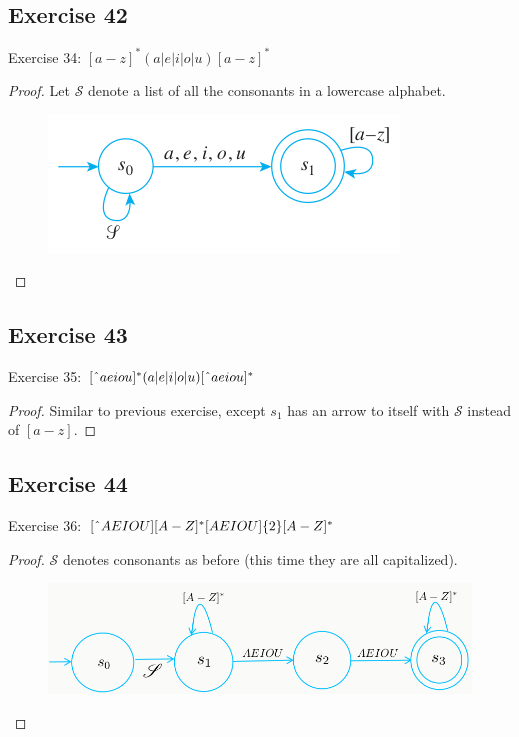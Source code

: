 \documentclass[14pt]{extarticle}
\begin{document}
\subsection{Exercise 42}
Exercise 34: \([a - z]^*(a | e | i | o | u)[a - z]^*\)
\begin{proof}
Let \(\mathscr{S}\) denote a list of all the consonants in a lowercase alphabet.

\begin{figure}[ht!]
\centering
\includegraphics[scale=0.5]{../images/12.2.42.png}
\end{figure}
\end{proof}

\subsection{Exercise 43}
Exercise 35: \([\string^ aeiou]^*(a|e|i|o|u)[\string^ aeiou]^*\)
\begin{proof}
Similar to previous exercise, except \(s_1\) has an arrow to itself with \(\mathscr{S}\) instead of \([a-z]\).
\end{proof}

\subsection{Exercise 44}
Exercise 36: \([\string^ AEIOU][A-Z]^*[AEIOU]\{2\}[A-Z]^*\)
\begin{proof}
\(\mathscr{S}\) denotes consonants as before (this time they are all capitalized).
\begin{figure}[ht!]
\centering
\includegraphics[scale=0.4]{../images/12.2.44.png}
\end{figure}
\end{proof}
\end{document}
